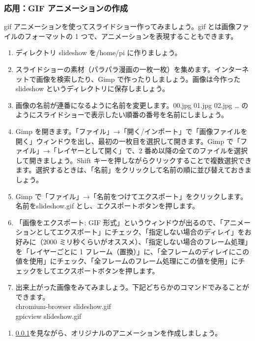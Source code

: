 \subsubsection{応用：GIF アニメーションの作成}
\label{GIF}
gif アニメーションを使ってスライドショー作ってみましょう。gif とは画像ファイルのフォーマットの 1 つで、アニメーションを表現することもできます。\\
\begin{enumerate}
\item ディレクトリ slideshow を/home/pi に作りましょう。\\
\item スライドショーの素材（パラパラ漫画の一枚一枚）を集めます。インターネットで画像を検索したり、Gimp で作ったりしましょう。画像は今作った slideshow というディレクトリに保存しましょう。\\
\item 画像の名前が連番になるように名前を変更します。00.jpg 01.jpg 02.jpg … のようにスライドショーで表示したい順番の番号を名前にしましょう。\\
\item Gimp を開きます。「ファイル」→「開く/インポート」で「画像ファイルを開く」ウィンドウを出し、最初の一枚目を選択して開きます。Gimp で「ファイル」→「レイヤーとして開く」で、2 番め以降の全てのファイルを選択して開きましょう。Shift キーを押しながらクリックすることで複数選択できます。選択するときは、「名前」をクリックして名前の順に並び替えておきましょう。\\
\item Gimp で「ファイル」→「名前をつけてエクスポート」をクリックします。名前をslideshow.gif とし、エクスポートボタンを押します。
\item 「画像をエクスポート: GIF 形式」というウィンドウが出るので、「アニメーションとしてエクスポート」にチェック、「指定しない場合のディレイ」をお好みに（2000 ミリ秒くらいがオススメ）、「指定しない場合のフレーム処理」を「レイヤーごとに 1 フレーム（置換）」に、「全フレームのディレイにこの値を使用」にチェック、「全フレームのフレーム処理にこの値を使用」にチェックをしてエクスポートボタンを押します。\\
\item 出来上がった画像をみてみましょう。下記どちらかのコマンドでみることができます。\\
chromium-browser slideshow.gif\\
gpicview slideshow.gif\\
\end{enumerate}

\begin{tcolorbox}[title=\useOmetoi]
\begin{enumerate}
\item \ref{GIF}を見ながら、オリジナルのアニメーションを作成しましょう。
\end{enumerate}
\end{tcolorbox}


